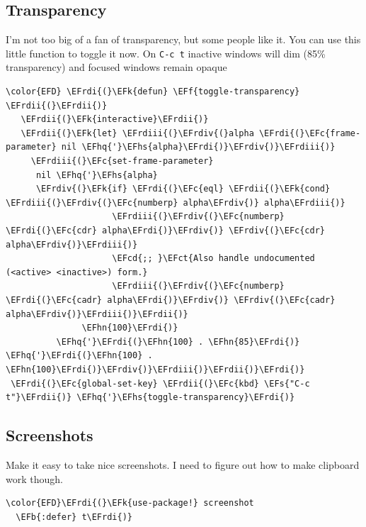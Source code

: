 \documentclass{scrartcl}
\newcommand{\EFk}[1]{\textcolor{EFk}{#1}} %
\newcommand{\EFs}[1]{\textcolor{EFs}{#1}} %
\newcommand{\EFb}[1]{\textcolor{EFb}{#1}} %
\newcommand{\EFct}[1]{\textcolor{EFct}{#1}} %
\newcommand{\EFc}[1]{\textcolor{EFc}{#1}} %
\newcommand{\EFf}[1]{\textcolor{EFf}{#1}} %
\newcommand{\EFcd}[1]{\textcolor{EFcd}{#1}} %
\newcommand{\EFhn}[1]{#1} %
\newcommand{\EFhq}[1]{#1} %
\newcommand{\EFhs}[1]{#1} %
\newcommand{\EFrdi}[1]{#1} %
\newcommand{\EFrdii}[1]{#1} %
\newcommand{\EFrdiii}[1]{#1} %
\newcommand{\EFrdiv}[1]{#1} %
\begin{document}
\subsection{Transparency}
\label{sec:org80778f2}
I'm not too big of a fan of transparency, but some people like it. You can use
this little function to toggle it now. On \texttt{C-c t} inactive windows will dim (85\%
transparency)  and focused windows remain opaque
\begin{Code}
\begin{Verbatim}[]
\color{EFD} \EFrdi{(}\EFk{defun} \EFf{toggle-transparency} \EFrdii{(}\EFrdii{)}
   \EFrdii{(}\EFk{interactive}\EFrdii{)}
   \EFrdii{(}\EFk{let} \EFrdiii{(}\EFrdiv{(}alpha \EFrdi{(}\EFc{frame-parameter} nil \EFhq{'}\EFhs{alpha}\EFrdi{)}\EFrdiv{)}\EFrdiii{)}
     \EFrdiii{(}\EFc{set-frame-parameter}
      nil \EFhq{'}\EFhs{alpha}
      \EFrdiv{(}\EFk{if} \EFrdi{(}\EFc{eql} \EFrdii{(}\EFk{cond} \EFrdiii{(}\EFrdiv{(}\EFc{numberp} alpha\EFrdiv{)} alpha\EFrdiii{)}
                     \EFrdiii{(}\EFrdiv{(}\EFc{numberp} \EFrdi{(}\EFc{cdr} alpha\EFrdi{)}\EFrdiv{)} \EFrdiv{(}\EFc{cdr} alpha\EFrdiv{)}\EFrdiii{)}
                     \EFcd{;; }\EFct{Also handle undocumented (<active> <inactive>) form.}
                     \EFrdiii{(}\EFrdiv{(}\EFc{numberp} \EFrdi{(}\EFc{cadr} alpha\EFrdi{)}\EFrdiv{)} \EFrdiv{(}\EFc{cadr} alpha\EFrdiv{)}\EFrdiii{)}\EFrdii{)}
               \EFhn{100}\EFrdi{)}
          \EFhq{'}\EFrdi{(}\EFhn{100} . \EFhn{85}\EFrdi{)} \EFhq{'}\EFrdi{(}\EFhn{100} . \EFhn{100}\EFrdi{)}\EFrdiv{)}\EFrdiii{)}\EFrdii{)}\EFrdi{)}
 \EFrdi{(}\EFc{global-set-key} \EFrdii{(}\EFc{kbd} \EFs{"C-c t"}\EFrdii{)} \EFhq{'}\EFhs{toggle-transparency}\EFrdi{)}
\end{Verbatim}
\end{Code}

\subsection{Screenshots}
\label{sec:orgaad860b}
Make it easy to take nice screenshots. I need to figure out how to make
clipboard work though.
\begin{Code}
\begin{Verbatim}[]
\color{EFD}\EFrdi{(}\EFk{use-package!} screenshot
  \EFb{:defer} t\EFrdi{)}
\end{Verbatim}
\end{Code}
\end{document}
